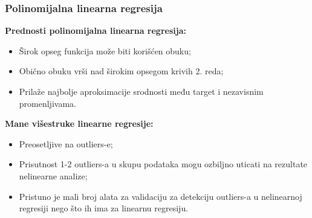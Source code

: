 \documentclass[fontsize=12bp, paper=a4]{scrarticle}
\begin{document}
\subsubsection{Polinomijalna linearna regresija}
\textbf{Prednosti polinomijalna linearna regresija:\cite{plr}} 
\begin{itemize}
    \item Širok opseg funkcija može biti korišćen obuku;
    \item Obično obuku vrši nad širokim opsegom krivih 2. reda;
    \item Prilaže najbolje aproksimacije srodnosti među target i nezavisnim promenljivama.
\end{itemize}
\textbf{Mane višestruke linearne regresije:}
\begin{itemize}


    \item Preosetljive na outliers-e;
    \item Prisutnost 1-2 outliers-a u skupu podataka mogu ozbiljno uticati na rezultate nelinearne analize;
    \item Pristuno je mali broj alata za validaciju za detekciju outliers-a u nelinearnoj regresiji nego što ih ima za linearnu regresiju.
\end{itemize}


\end{document}

